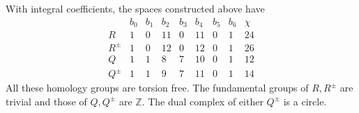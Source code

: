 \begin{proposition}\label{push:src:A.4.1}\label{push:A41}
With integral coefficients, the spaces constructed above have
\[
\begin{array}{c|rrrrrrr|r}
&b_0&b_1&b_2&b_3&b_4&b_5&b_6&\chi\\\hline
R&1&0&11&0&11&0&1&24\\
R^\pm&1&0&12&0&12&0&1&26\\
Q&1&1&8&7&10&0&1&12\\
Q^\pm&1&1&9&7&11&0&1&14
\end{array}
\]
All these homology groups are torsion free. The fundamental
groups of $R,R^\pm$ are trivial and those of $Q,Q^\pm$ are
$\mathbb Z$. The dual complex of either $Q^\pm$ is a circle.
\end{proposition}

